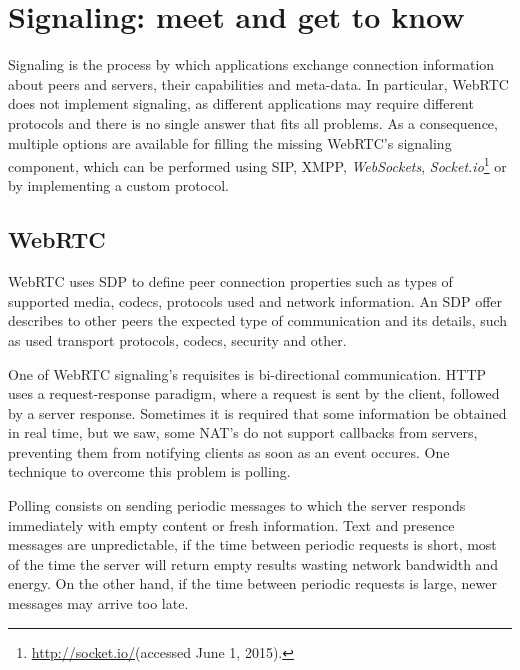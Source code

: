 \section{Signaling: meet and get to know}
\label{signaling}


  Signaling is the process by which applications exchange connection information about peers and servers, their capabilities and meta-data.
  In particular, \ac{WebRTC} does not implement signaling, as different applications may require different protocols and there is no single answer that fits all problems.
  As a consequence, multiple options are available for filling the missing \ac{WebRTC}'s signaling component, which can be performed using \ac{SIP}, \ac{XMPP}, \emph{WebSockets}, \emph{Socket.io}\footnote{\url{http://socket.io/}(accessed June 1, 2015).} or by implementing a custom protocol.

  \subsection{WebRTC}

  \ac{WebRTC} uses \ac{SDP} \cite{rfc4566} to define peer connection properties such as types of supported media, codecs, protocols used and network information. An \ac{SDP} offer describes to other peers the expected type of communication and its details, such as used transport protocols, codecs, security and other.

  One of \ac{WebRTC} signaling's requisites is bi-directional communication.
  \ac{HTTP} uses a request-response paradigm, where a request is sent by the client, followed by a server response.
  Sometimes it is required that some information be obtained in real time, but we saw, some \ac{NAT}'s do not support callbacks from servers, preventing them from notifying clients as soon as an event occures.
One technique to overcome this problem is polling.
  
Polling consists on sending periodic messages to which the server responds immediately with empty content or fresh information. Text and presence messages are unpredictable, if the time between periodic requests is short, most of the time the server will return empty results wasting network bandwidth and energy. On the other hand, if the time between periodic requests is large, newer messages may arrive too late.

